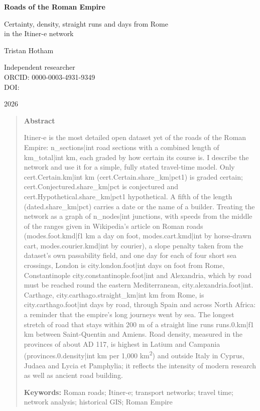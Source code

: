 \documentclass[11pt,a4paper]{article}
\begin{document}
\begin{center}
{\Large\bfseries Roads of the Roman Empire\par}
\vspace{0.4em}
{\large Certainty, density, straight runs and days from Rome\\in the Itiner-e network\par}
\vspace{1.2em}
{\large Tristan Hotham\par}
\vspace{0.3em}
{\small Independent researcher\\
ORCID: 0000-0003-4931-9349\\
DOI: \par}
\vspace{0.8em}
2026
\end{center}

\begin{quote}
\small
\begin{center}\textbf{Abstract}\end{center}
Itiner-e is the most detailed open dataset yet of the roads of the Roman Empire: {{n_sections|int}} road sections with a combined length of {{km_total|int}} km, each graded by how certain its course is. I describe the network and use it for a simple, fully stated travel-time model. Only {{cert.Certain.km|int}} km ({{cert.Certain.share_km|pct1}}) is graded certain; {{cert.Conjectured.share_km|pct}} is conjectured and {{cert.Hypothetical.share_km|pct1}} hypothetical. A fifth of the length ({{dated.share_km|pct}}) carries a date or the name of a builder. Treating the network as a graph of {{n_nodes|int}} junctions, with speeds from the middle of the ranges given in Wikipedia's article on Roman roads ({{modes.foot.kmd|f1}} km a day on foot, {{modes.cart.kmd|int}} by horse-drawn cart, {{modes.courier.kmd|int}} by courier), a slope penalty taken from the dataset's own passability field, and one day for each of four short sea crossings, London is {{city.london.foot|int}} days on foot from Rome, Constantinople {{city.constantinople.foot|int}} and Alexandria, which by road must be reached round the eastern Mediterranean, {{city.alexandria.foot|int}}. Carthage, {{city.carthago.straight_km|int}} km from Rome, is {{city.carthago.foot|int}} days by road, through Spain and across North Africa: a reminder that the empire's long journeys went by sea. The longest stretch of road that stays within 200 m of a straight line runs {{runs.0.km|f1}} km between Saint-Quentin and Amiens. Road density, measured in the provinces of about AD 117, is highest in Latium and Campania ({{provinces.0.density|int}} km per 1,000 km\textsuperscript{2}) and outside Italy in Cyprus, Judaea and Lycia et Pamphylia; it reflects the intensity of modern research as well as ancient road building.

\textbf{Keywords:} Roman roads; Itiner-e; transport networks; travel time; network analysis; historical GIS; Roman Empire
\end{quote}
\end{document}
